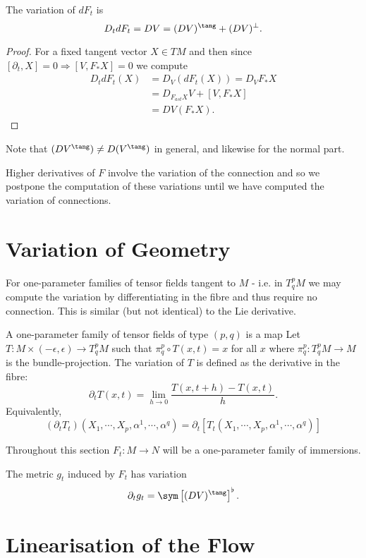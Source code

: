\begin{prop}
The variation of \(dF_t\) is
\[
D_t dF_t = DV = (DV)^{\tang} + (DV)^{\perp}.
\]
\end{prop}

\begin{proof}
For a fixed tangent vector \(X \in TM\) and then since \([\partial_t, X] = 0 \Rightarrow [V, F_{\ast} X] = 0\) we compute
\[
\begin{split}
D_t dF_t (X) &= D_V (dF_t (X)) = D_V F_{\ast} X \\
&= D_{F_{ast} X} V + [V, F_{\ast} X] \\
&= DV (F_{\ast} X).
\end{split}
\]
\end{proof}

\begin{remark}
Note that \((DV^{\tang}) \ne D(V^{\tang})\) in general, and likewise for the normal part.
\end{remark}

Higher derivatives of \(F\) involve the variation of the connection and so we postpone the computation of these variations until we have computed the variation of connections.

\section{Variation of Geometry}

For one-parameter families of tensor fields tangent to \(M\) - i.e. in \(T^p_q M\) we may compute the variation by differentiating in the fibre and thus require no connection. This is similar (but not identical) to the Lie derivative.

\begin{defn}
A one-parameter family of tensor fields of type \((p, q)\) is a map
Let \(T : M \times (-\epsilon, \epsilon) \to T^p_q M\) such that \(\pi^p_q \circ T(x, t) = x\) for all \(x\) where \(\pi^p_q : T^p_q M \to M\) is the bundle-projection. The variation of \(T\) is defined as the derivative in the fibre:
\[
\partial_t T (x, t) = \lim_{h\to 0} \frac{T(x, t + h) - T(x, t)}{h}.
\]
Equivalently,
\[
(\partial_t T_t) (X_1, \cdots, X_p, \alpha^1, \cdots, \alpha^q) = \partial_t \left[T_t (X_1, \cdots, X_p, \alpha^1, \cdots, \alpha^q)\right]
\]
\end{defn}

Throughout this section \(F_t : M \to N\) will be a one-parameter family of immersions.

\begin{lemma}
The metric \(g_t\) induced by \(F_t\) has variation
\[
\partial_t g_t = \sym \left[(DV)^{\tang}\right]^{\flat}.
\]
\end{lemma}

\section{Linearisation of the Flow}